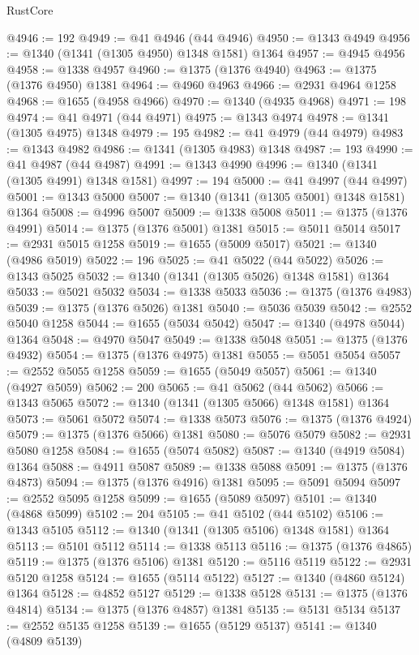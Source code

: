 \begin{lexlean}{RustCore}
\begin{coremodule}
@4946 := 192
@4949 := @41 @4946 (@44 @4946)
@4950 := @1343 @4949
@4956 := @1340 (@1341 (@1305 @4950) @1348 @1581) @1364
@4957 := @4945 @4956
@4958 := @1338 @4957
@4960 := @1375 (@1376 @4940)
@4963 := @1375 (@1376 @4950) @1381
@4964 := @4960 @4963
@4966 := @2931 @4964 @1258
@4968 := @1655 (@4958 @4966)
@4970 := @1340 (@4935 @4968)
@4971 := 198
@4974 := @41 @4971 (@44 @4971)
@4975 := @1343 @4974
@4978 := @1341 (@1305 @4975) @1348
@4979 := 195
@4982 := @41 @4979 (@44 @4979)
@4983 := @1343 @4982
@4986 := @1341 (@1305 @4983) @1348
@4987 := 193
@4990 := @41 @4987 (@44 @4987)
@4991 := @1343 @4990
@4996 := @1340 (@1341 (@1305 @4991) @1348 @1581)
@4997 := 194
@5000 := @41 @4997 (@44 @4997)
@5001 := @1343 @5000
@5007 := @1340 (@1341 (@1305 @5001) @1348 @1581) @1364
@5008 := @4996 @5007
@5009 := @1338 @5008
@5011 := @1375 (@1376 @4991)
@5014 := @1375 (@1376 @5001) @1381
@5015 := @5011 @5014
@5017 := @2931 @5015 @1258
@5019 := @1655 (@5009 @5017)
@5021 := @1340 (@4986 @5019)
@5022 := 196
@5025 := @41 @5022 (@44 @5022)
@5026 := @1343 @5025
@5032 := @1340 (@1341 (@1305 @5026) @1348 @1581) @1364
@5033 := @5021 @5032
@5034 := @1338 @5033
@5036 := @1375 (@1376 @4983)
@5039 := @1375 (@1376 @5026) @1381
@5040 := @5036 @5039
@5042 := @2552 @5040 @1258
@5044 := @1655 (@5034 @5042)
@5047 := @1340 (@4978 @5044) @1364
@5048 := @4970 @5047
@5049 := @1338 @5048
@5051 := @1375 (@1376 @4932)
@5054 := @1375 (@1376 @4975) @1381
@5055 := @5051 @5054
@5057 := @2552 @5055 @1258
@5059 := @1655 (@5049 @5057)
@5061 := @1340 (@4927 @5059)
@5062 := 200
@5065 := @41 @5062 (@44 @5062)
@5066 := @1343 @5065
@5072 := @1340 (@1341 (@1305 @5066) @1348 @1581) @1364
@5073 := @5061 @5072
@5074 := @1338 @5073
@5076 := @1375 (@1376 @4924)
@5079 := @1375 (@1376 @5066) @1381
@5080 := @5076 @5079
@5082 := @2931 @5080 @1258
@5084 := @1655 (@5074 @5082)
@5087 := @1340 (@4919 @5084) @1364
@5088 := @4911 @5087
@5089 := @1338 @5088
@5091 := @1375 (@1376 @4873)
@5094 := @1375 (@1376 @4916) @1381
@5095 := @5091 @5094
@5097 := @2552 @5095 @1258
@5099 := @1655 (@5089 @5097)
@5101 := @1340 (@4868 @5099)
@5102 := 204
@5105 := @41 @5102 (@44 @5102)
@5106 := @1343 @5105
@5112 := @1340 (@1341 (@1305 @5106) @1348 @1581) @1364
@5113 := @5101 @5112
@5114 := @1338 @5113
@5116 := @1375 (@1376 @4865)
@5119 := @1375 (@1376 @5106) @1381
@5120 := @5116 @5119
@5122 := @2931 @5120 @1258
@5124 := @1655 (@5114 @5122)
@5127 := @1340 (@4860 @5124) @1364
@5128 := @4852 @5127
@5129 := @1338 @5128
@5131 := @1375 (@1376 @4814)
@5134 := @1375 (@1376 @4857) @1381
@5135 := @5131 @5134
@5137 := @2552 @5135 @1258
@5139 := @1655 (@5129 @5137)
@5141 := @1340 (@4809 @5139)

\end{coremodule}
\end{lexlean}

